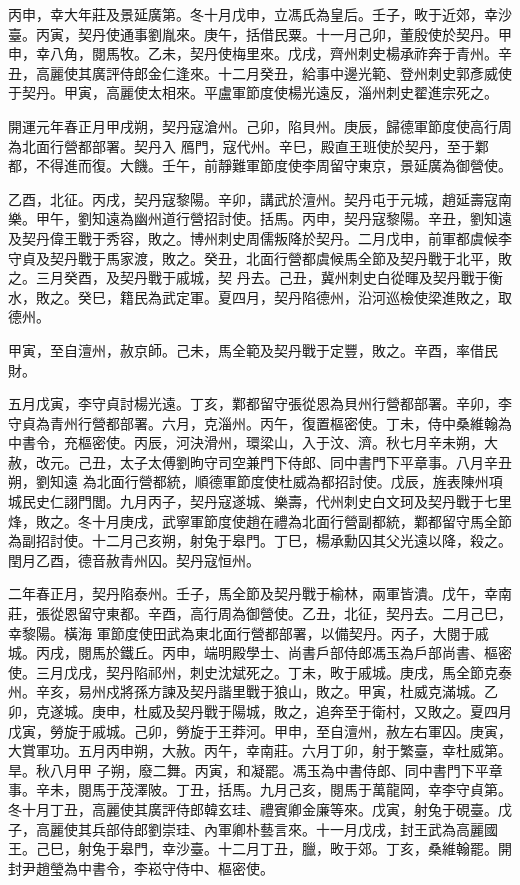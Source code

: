 \begin{pinyinscope}
 丙申，幸大年莊及景延廣第。冬十月戊申，立馮氏為皇后。壬子，畋于近郊，幸沙臺。丙寅，契丹使通事劉胤來。庚午，括借民粟。十一月己卯，董殷使於契丹。甲申，幸八角，閱馬牧。乙未，契丹使梅里來。戊戌，齊州刺史楊承祚奔于青州。辛丑，高麗使其廣評侍郎金仁逢來。十二月癸丑，給事中邊光範、登州刺史郭彥威使于契丹。甲寅，高麗使太相來。平盧軍節度使楊光遠反，淄州刺史翟進宗死之。



 開運元年春正月甲戌朔，契丹寇滄州。己卯，陷貝州。庚辰，歸德軍節度使高行周為北面行營都部署。契丹入
 鴈門，寇代州。辛巳，殿直王班使於契丹，至于鄴都，不得進而復。大饑。壬午，前靜難軍節度使李周留守東京，景延廣為御營使。



 乙酉，北征。丙戌，契丹寇黎陽。辛卯，講武於澶州。契丹屯于元城，趙延壽寇南樂。甲午，劉知遠為幽州道行營招討使。括馬。丙申，契丹寇黎陽。辛丑，劉知遠及契丹偉王戰于秀容，敗之。博州刺史周儒叛降於契丹。二月戊申，前軍都虞候李守貞及契丹戰于馬家渡，敗之。癸丑，北面行營都虞候馬全節及契丹戰于北平，敗之。三月癸酉，及契丹戰于戚城，契
 丹去。己丑，冀州刺史白從暉及契丹戰于衡水，敗之。癸巳，籍民為武定軍。夏四月，契丹陷德州，沿河巡檢使梁進敗之，取德州。



 甲寅，至自澶州，赦京師。己未，馬全範及契丹戰于定豐，敗之。辛酉，率借民財。



 五月戊寅，李守貞討楊光遠。丁亥，鄴都留守張從恩為貝州行營都部署。辛卯，李守貞為青州行營都部署。六月，克淄州。丙午，復置樞密使。丁未，侍中桑維翰為中書令，充樞密使。丙辰，河決滑州，環梁山，入于汶、濟。秋七月辛未朔，大赦，改元。己丑，太子太傅劉昫守司空兼門下侍郎、同中書門下平章事。八月辛丑朔，劉知遠
 為北面行營都統，順德軍節度使杜威為都招討使。戊辰，旌表陳州項城民史仁詡門閭。九月丙子，契丹寇遂城、樂壽，代州刺史白文珂及契丹戰于七里烽，敗之。冬十月庚戌，武寧軍節度使趙在禮為北面行營副都統，鄴都留守馬全節為副招討使。十二月己亥朔，射兔于皋門。丁巳，楊承勳囚其父光遠以降，殺之。閏月乙酉，德音赦青州囚。契丹寇恒州。



 二年春正月，契丹陷泰州。壬子，馬全節及契丹戰于榆林，兩軍皆潰。戊午，幸南莊，張從恩留守東都。辛酉，高行周為御營使。乙丑，北征，契丹去。二月己巳，幸黎陽。橫海
 軍節度使田武為東北面行營都部署，以備契丹。丙子，大閱于戚城。丙戌，閱馬於鐵丘。丙申，端明殿學士、尚書戶部侍郎馮玉為戶部尚書、樞密使。三月戊戌，契丹陷祁州，刺史沈斌死之。丁未，畋于戚城。庚戌，馬全節克泰州。辛亥，易州戍將孫方諫及契丹諧里戰于狼山，敗之。甲寅，杜威克滿城。乙卯，克遂城。庚申，杜威及契丹戰于陽城，敗之，追奔至于衛村，又敗之。夏四月戊寅，勞旋于戚城。己卯，勞旋于王莽河。甲申，至自澶州，赦左右軍囚。庚寅，大賞軍功。五月丙申朔，大赦。丙午，幸南莊。六月丁卯，射于繁臺，幸杜威第。旱。秋八月甲
 子朔，廢二舞。丙寅，和凝罷。馮玉為中書侍郎、同中書門下平章事。辛未，閱馬于茂澤陂。丁丑，括馬。九月己亥，閱馬于萬龍岡，幸李守貞第。冬十月丁丑，高麗使其廣評侍郎韓玄珪、禮賓卿金廉等來。戊寅，射兔于硯臺。戊子，高麗使其兵部侍郎劉崇珪、內軍卿朴藝言來。十一月戊戌，封王武為高麗國王。己巳，射兔于皋門，幸沙臺。十二月丁丑，臘，畋于郊。丁亥，桑維翰罷。開封尹趙瑩為中書令，李崧守侍中、樞密使。




\end{pinyinscope}
